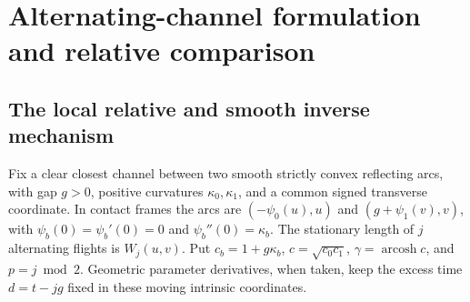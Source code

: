 \section{Alternating-channel formulation and relative comparison}
\label{sec:v56-introduction}
\subsection{The local relative and smooth inverse mechanism}

Fix a clear closest channel between two smooth strictly convex reflecting
arcs, with gap $g>0$, positive curvatures $\kappa_0,\kappa_1$, and a
common signed transverse coordinate.  In contact frames the arcs are
$(-\psi_0(u),u)$ and $(g+\psi_1(v),v)$, with
$\psi_b(0)=\psi_b'(0)=0$ and $\psi_b''(0)=\kappa_b$.
The stationary length of $j$ alternating flights is $W_j(u,v)$.
Put $c_b=1+g\kappa_b$, $c=\sqrt{c_0c_1}$,
$\gamma=\operatorname{arcosh}c$, and $p=j\bmod2$.  Geometric
parameter derivatives, when taken, keep the excess time
$d=t-jg$ fixed in these moving intrinsic coordinates.

